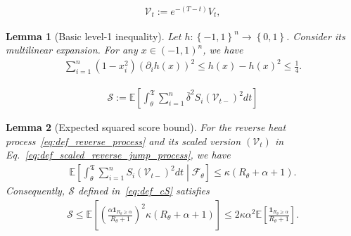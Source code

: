 \documentclass[10pt,a4paper]{amsart}
\newtheorem{lemma}{Lemma}
\newcommand{\Exs}{\ensuremath{{\mathbb{E}}}}
\newcommand{\bdelta}{\bar{\delta}}
\newcommand{\braces}[1]{\left\{ #1 \right \}}
\newcommand{\brackets}[1]{\left[ #1 \right]}
\newcommand{\btau}{\kappa}
\newcommand{\cS}{\mathcal{S}}
\newcommand{\defn}{:=}
\newcommand{\excess}{\alpha}
\newcommand{\parenth}[1]{\left( #1 \right)}
\newcommand{\rV}{\mathscr{V}}
\newcommand{\sF}{\mathscr{F}}
\newcommand{\stopT}{{\boldsymbol{\mathfrak{T}}}}
\newcommand{\uV}{V}
\begin{document}
\begin{align}
  \label{eq:def_scaled_reverse_jump_process}
  \rV_t \defn e^{-(T-t)} \uV_t, 
\end{align}

\begin{lemma}[Basic level-1 inequality]
  \label{lem:level_1_ineq}
  Let $h: \braces{-1,1}^n \to \braces{0, 1}$. Consider its multilinear expansion. For any $x \in (-1,1)^n$, we have
  \begin{align*}
    \sum_{i=1}^n (1-x_i^2) \parenth{\partial_i h(x)}^2 \leq h(x) - h(x)^2 \leq \frac14. 
  \end{align*}
\end{lemma}

\begin{align}
  \label{eq:def_cS}
  \cS \defn \Exs \brackets{ \int_{\theta}^{\stopT} \sum_{i=1}^n \bdelta^2 S_i(\rV_{t-})^2 dt}
\end{align}

\begin{lemma}[Expected squared score bound] 
  \label{lem:expected_squared_score_bound}
  For the reverse heat process~\eqref{eq:def_reverse_process} and its scaled version $(\rV_t)$ in Eq.~\eqref{eq:def_scaled_reverse_jump_process}, we have
  \begin{align*}
    \Exs \brackets{ \int_{\theta}^{\stopT} \sum_{i=1}^n S_i(\rV_{t-})^2 dt \middle| \sF_\theta} \leq \btau (R_\theta + \excess + 1).
  \end{align*}
  Consequently, $\cS$ defined in~\eqref{eq:def_cS} satisfies
  \begin{align*}
    \cS \leq \Exs \brackets{\parenth{\frac{\excess \mathbf{1}_{R_\theta \geq \excess}}{R_\theta + 1} }^2 \btau (R_\theta + \excess + 1)} \leq 2 \btau \excess^2 \Exs\brackets{\frac{\mathbf{1}_{R_\theta \geq \excess}}{R_\theta + 1}}.
  \end{align*}
\end{lemma}
\end{document}
